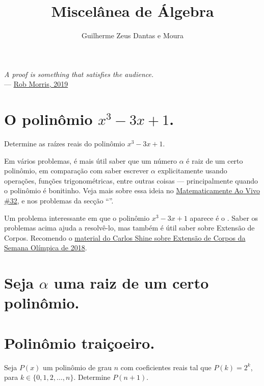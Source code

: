 \documentclass[10pt,a4paper]{article}
\title{Miscelânea de Álgebra}
\author{Guilherme Zeus Dantas e Moura}
\begin{document}
	
	\zeustitle

	\hfill 
	\begin{minipage}{7.4cm}
		{\textit{A proof is something that satisfies the audience.} \\ --- \href{https://youtu.be/nJP7hkYuiFg?t=1535}{Rob Morris, 2019}}
	\end{minipage}


	\section*{O polinômio $x^3 - 3x + 1$.}

	\begin{prob}[$x^3 - 3x + 1 = 0$, $x \in \RR$]\label{prob:achar-raizes}
		Determine as raízes reais do polinômio $x^3 - 3x + 1$.
	\end{prob}

	Em vários problemas, é mais útil saber que um número $\alpha$ é raiz de um certo polinômio, em comparação com saber escrever $\alpha$ explicitamente usando operações, funções trigonométricas, entre outras coisas --- principalmente quando o polinômio é bonitinho. Veja mais sobre essa ideia no \href{https://youtu.be/8EoVi_GV-vM}{Matematicamente Ao Vivo \#32}, e nos problemas da secção ``''. 

	Um problema interessante em que o polinômio $x^3 - 3x + 1$ aparece é o . Saber os problemas acima ajuda a resolvê-lo, mas também é útil saber sobre Extensão de Corpos. Recomendo o \href{https://www.obm.org.br/content/uploads/2018/01/Carlos_Shine_-algebra_abstrata.pdf}{material do Carlos Shine sobre Extensão de Corpos da Semana Olímpica de 2018}.
	

	\section*{Seja $\alpha$ uma raiz de um certo polinômio.}\label{sec:root}

	\section*{Polinômio traiçoeiro.}

	\begin{prob}[$P(k) = 2^k$, $P(n+1) =\ ?$] \label{P(k)=2^k}
		Seja $P(x)$ um polinômio de grau $n$ com coeficientes reais tal que $P(k) = 2^k$, para $k \in \{0, 1, 2, \dots, n\}$. Determine $P(n+1)$.
	\end{prob}
	
\end{document}
